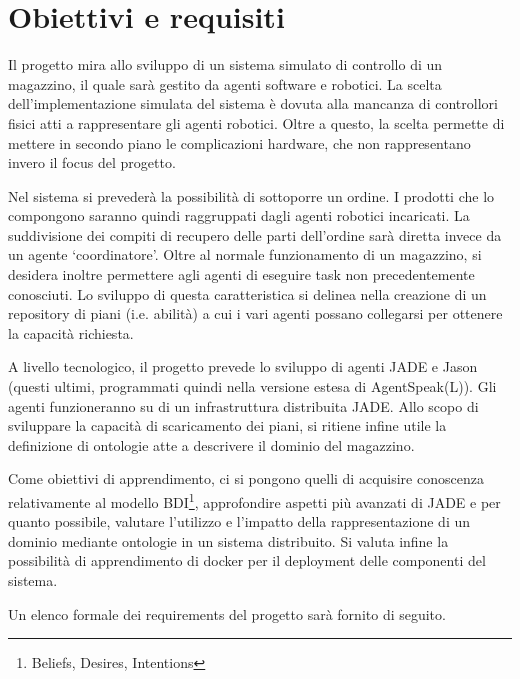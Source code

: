 \section{Obiettivi e requisiti}

Il progetto mira allo sviluppo di un sistema simulato di controllo di un magazzino, il quale sarà gestito da agenti software e robotici. La scelta dell’implementazione simulata del sistema è dovuta alla mancanza di controllori fisici atti a rappresentare gli agenti robotici. Oltre a questo, la scelta permette di mettere in secondo piano le complicazioni
hardware, che non rappresentano invero il focus del progetto.

\parag
Nel sistema si prevederà la possibilità di sottoporre un ordine. I prodotti che lo compongono saranno quindi raggruppati dagli agenti robotici incaricati. La suddivisione dei compiti di recupero delle parti dell'ordine sarà diretta invece da un agente `coordinatore'.\newline
Oltre al normale funzionamento di un magazzino, si desidera inoltre permettere agli agenti di eseguire task non precedentemente conosciuti. Lo sviluppo di questa caratteristica si delinea nella creazione di un repository di piani (i.e. abilità) a cui i vari agenti possano collegarsi per ottenere la capacità richiesta.

\parag
A livello tecnologico, il progetto prevede lo sviluppo di agenti JADE e Jason (questi ultimi, programmati quindi nella versione estesa di AgentSpeak(L)). Gli agenti funzioneranno su di un infrastruttura distribuita JADE.
Allo scopo di sviluppare la capacità di scaricamento dei piani, si ritiene infine utile la definizione di ontologie atte a descrivere il dominio del magazzino.

\parag
Come obiettivi di apprendimento, ci si pongono quelli di acquisire conoscenza relativamente al modello BDI\footnote{Beliefs, Desires, Intentions}, approfondire aspetti più avanzati di JADE e per quanto
possibile, valutare l'utilizzo e l'impatto della rappresentazione di un dominio mediante ontologie in un sistema distribuito. Si valuta infine la possibilità di apprendimento di docker per il deployment delle componenti del sistema.

\parag
Un elenco formale dei requirements del progetto sarà fornito di seguito.

